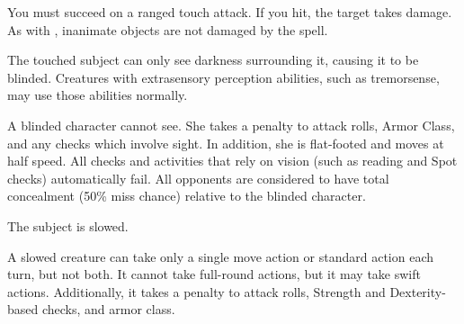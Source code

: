 \spellrng{\rngclose}
\begin{spelleffect}
You must succeed on a ranged touch attack. If you hit, the target takes damage. As with , inanimate objects are not damaged by the spell.
\end{spelleffect}

\begin{spelleffect}
  The touched subject can only see darkness surrounding it, causing it to be blinded. Creatures with extrasensory perception abilities, such as tremorsense, may use those abilities normally.
\end{spelleffect}
\begin{spellnotes}
   A blinded character cannot see. She takes a  penalty to attack rolls, Armor Class, and any checks which involve sight. In addition, she is flat-footed and moves at half speed. All checks and activities that rely on vision (such as reading and Spot checks) automatically fail. All opponents are considered to have total concealment (50\% miss chance) relative to the blinded character.
\end{spellnotes}

\spellrng{\rngmed}
\spellrng{\rngmed}
\begin{spelleffect}
The subject is slowed.
\end{spelleffect}
\begin{spellnotes}
 A slowed creature can take only a single move action or standard action each turn, but not both. It cannot take full-round actions, but it may take swift actions. Additionally, it takes a  penalty to attack rolls, Strength and Dexterity-based checks, and armor class.
\end{spellnotes}

